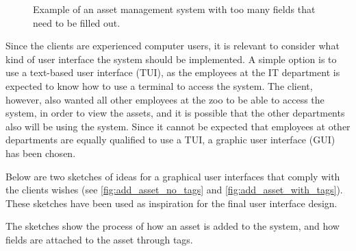 \begin{figure}[H]
    \centering
    \caption{Example of an asset management system with too many fields that need to be filled out. \cite{SnipeIT}}
    \label{fig:too-many-fields}
\end{figure}

Since the clients are experienced computer users, it is relevant to consider what kind of user interface the system should be implemented. A simple option is to use a text-based user interface (TUI), as the employees at the IT department is expected to know how to use a terminal to access the system. The client, however, also wanted all other employees at the zoo to be able to access the system, in order to view the assets, and it is possible that the other departments also will be using the system. Since it cannot be expected that employees at other departments are equally qualified to use a TUI, a graphic user interface (GUI) has been chosen. 
\par
Below are two sketches of ideas for a graphical user interfaces that comply with the clients wishes (see \autoref{fig:add_asset_no_tags} and \autoref{fig:add_asset_with_tags}). These sketches have been used as inspiration for the final user interface design.
\par
The sketches show the process of how an asset is added to the system, and how fields are attached to the asset through tags.

